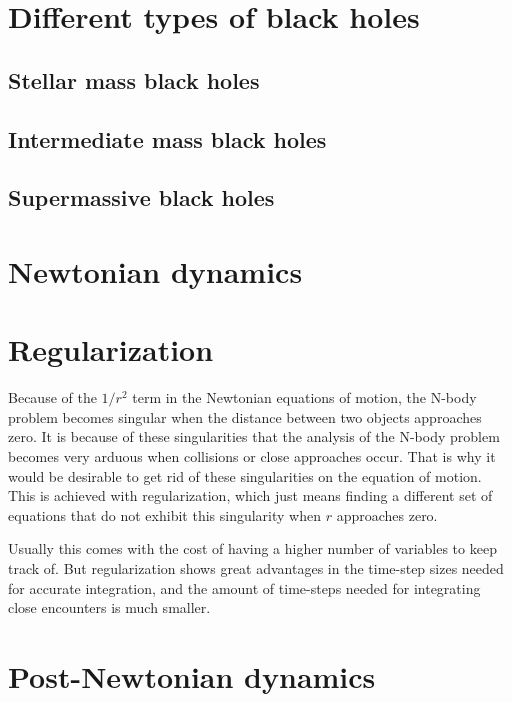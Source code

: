 \documentclass[english, oneside]{HYgradu}
\begin{document}

\section{Different types of black holes}

\subsection{Stellar mass black holes}


\subsection{Intermediate mass black holes}
\subsection{Supermassive black holes}

\section{Newtonian dynamics}

\section{Regularization}

Because of the $1/r^2$ term in the Newtonian equations of motion, the N-body problem becomes singular when the distance between two objects approaches zero. It is because of these singularities that the analysis of the N-body problem becomes very arduous when collisions or close approaches occur. That is why it would be desirable to get rid of these singularities on the equation of motion. This is achieved with regularization, which just means finding a different set of equations that do not exhibit this singularity when $r$ approaches zero.

Usually this comes with the cost of having a higher number of variables to keep track of. But regularization shows great advantages in the time-step sizes needed for accurate integration, and the amount of time-steps needed for integrating close encounters is much smaller. 

\section{Post-Newtonian dynamics}
\end{document}
